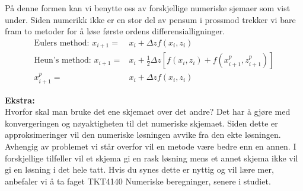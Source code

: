 På denne formen kan vi benytte oss av forskjellige numeriske sjemaer som vist under. Siden numerikk ikke er en stor del av pensum i prossmod trekker vi bare fram to metoder for å løse første ordens differensialligninger. 
\begin{align}
    \label{eq:numerical_schemes}
    \text{Eulers method: } x_{i+1} =& x_{i} + \Delta z f(x_i,z_i) \\[0.3cm]
    \text{Heun's method: }x_{i+1} =& x_i + \frac{1}{2}\Delta z[f(x_i,z_i)+f(x_{i+1}^p,z_{i+1}^p)] \\
    x_{i+1}^p =& x_{i} + \Delta z f(x_i,z_i)
\end{align}

\textbf{Ekstra:}\\
Hvorfor skal man bruke det ene skjemaet over det andre? Det har å gjøre med konvergeringen og nøyaktigheten til det numeriske skjemaet. Siden dette er approksimeringer vil den numeriske løsningen avvike fra den ekte løsningen. Avhengig av problemet vi står overfor vil en metode være bedre enn en annen. I forskjellige tilfeller vil et skjema gi en rask løsning mens et annet skjema ikke vil gi en løsning i det hele tatt. Hvis du synes dette er nyttig og vil lære mer, anbefaler vi å ta faget TKT4140 Numeriske beregninger, senere i studiet.  


